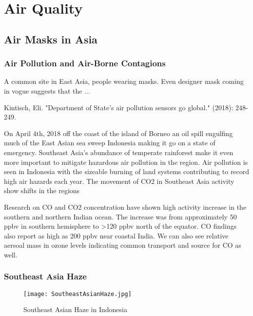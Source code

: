 \chapter{Air Quality}\label{ch:air_quality}

\section{Air Masks in Asia}

\subsection{Air Pollution and Air-Borne Contagions}

A common site in East Asia, people wearing masks. Even designer mask coming in vogue suggests that the ...


Kintisch, Eli. "Department of State's air pollution sensors go global." (2018): 248-249.


On April 4th, 2018 off the coast of the island of Borneo an oil spill engulfing much of the East Asian sea sweep Indonesia making it go on a state of emergency. Southeast Asia's abundance of temperate rainforest make it even more important to mitigate hazardous air pollution in the region. Air pollution is seen in Indonesia with the sizeable burning of land systems contributing to record high air hazards each year. The movement of CO2 in Southeast Asia activity show shifts in the regions 

Research on CO and CO2 concentration have shown high activity increase in the southern and northern Indian ocean. The increase was from approximately 50 ppbv in southern hemisphere to >120 ppbv north of the equator. CO findings also report as high as 200 ppbv near coastal India. We can also see relative aersoal mass in ozone levels indicating common transport and source for CO as well. \citep{phadnis2002evolution}

\subsection{Southeast Asia Haze}

\begin{figure}[ht]
  \texttt{[image: SoutheastAsianHaze.jpg]}
  \caption{Southeast Asian Haze in Indonesia}
  \label{fig:southeastasiahaze}
\end{figure}

